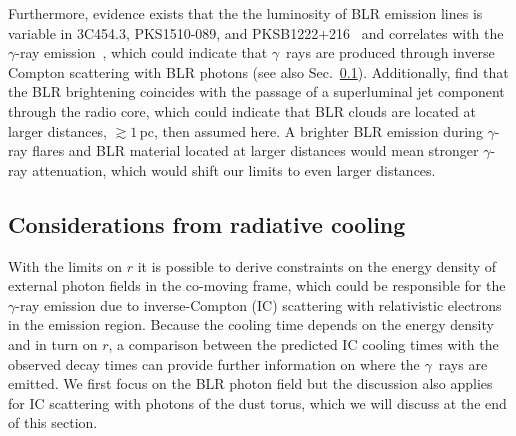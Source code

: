 \documentclass[twocolumn,linenumbers]{aastex62}
\newcommand{\Grays}{$\gamma$~rays\xspace}
\newcommand{\gray}{$\gamma$-ray\xspace}
\begin{document}
Furthermore, evidence exists that the the luminosity of BLR emission lines is variable in 3C454.3, PKS1510-089, and PKSB1222+216~\citep{2013ApJ...763L..36L,2015ApJ...804....7I} and correlates with the \gray emission~\citep{2013ApJ...763L..36L,2015IAUS..313...43L}, which could indicate that \Grays are produced through inverse Compton scattering with BLR photons (see also Sec.~\ref{sec:tcool}).  
Additionally, \citet{2013ApJ...763L..36L} find that the BLR brightening coincides with the passage of a superluminal jet component through the radio core, which could indicate that BLR clouds are located at larger distances, $\gtrsim 1\,$pc, then assumed here.
A brighter BLR emission during \gray flares and BLR material located at larger distances would mean stronger \gray attenuation, which would shift our limits to even larger distances. 

\subsection{Considerations from radiative cooling}
\label{sec:tcool}

With the limits on $r$ it is possible to derive constraints on the energy density of external photon fields in the co-moving frame, which could be responsible for the \gray emission due to inverse-Compton (IC) scattering with relativistic electrons in the emission region. 
Because the cooling time depends on the energy density and in turn on $r$, a comparison between the predicted IC cooling times with the observed decay times can provide further information on where the \Grays are emitted.
We first focus on the BLR photon field but the discussion also applies for IC scattering with photons of the dust torus, which we will discuss at the end of this section.
\end{document}
